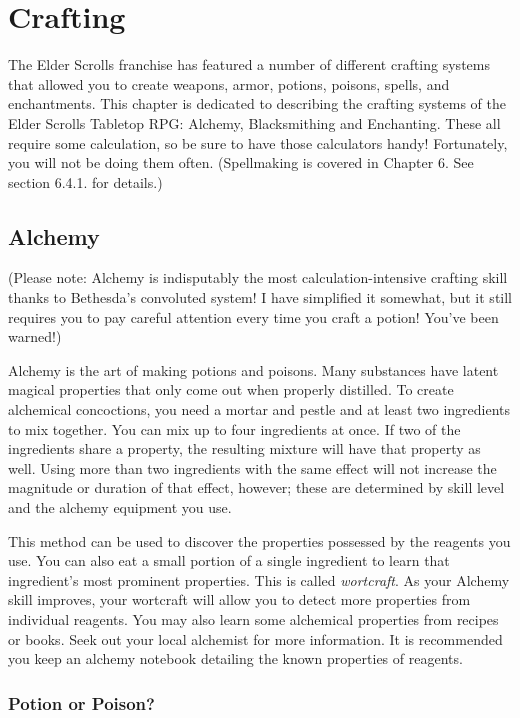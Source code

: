 \documentclass[12pt]{book}
\begin{document}
\chapter{Crafting}

The Elder Scrolls franchise has featured a number of different crafting systems that allowed you to create weapons, armor, potions, poisons, spells, and enchantments. This chapter is dedicated to describing the crafting systems of the Elder Scrolls Tabletop RPG: Alchemy, Blacksmithing and Enchanting. These all require some calculation, so be sure to have those calculators handy! Fortunately, you will not be doing them often. (Spellmaking is covered in Chapter 6. See section 6.4.1. for details.)

\section{Alchemy}

(Please note: Alchemy is indisputably the most calculation-intensive crafting skill thanks to Bethesda's convoluted system! I have simplified it somewhat, but it still requires you to pay careful attention every time you craft a potion! You've been warned!)

Alchemy is the art of making potions and poisons. Many substances have latent magical properties that only come out when properly distilled. To create alchemical concoctions, you need a mortar and pestle and at least two ingredients to mix together. You can mix up to four ingredients at once. If two of the ingredients share a property, the resulting mixture will have that property as well. Using more than two ingredients with the same effect will not increase the magnitude or duration of that effect, however; these are determined by skill level and the alchemy equipment you use.

This method can be used to discover the properties possessed by the reagents you use. You can also eat a small portion of a single ingredient to learn that ingredient's most prominent properties. This is called \textit{wortcraft}. As your Alchemy skill improves, your wortcraft will allow you to detect more properties from individual reagents. You may also learn some alchemical properties from recipes or books. Seek out your local alchemist for more information. It is recommended you keep an alchemy notebook detailing the known properties of reagents.

\subsection{Potion or Poison?}
\end{document}
